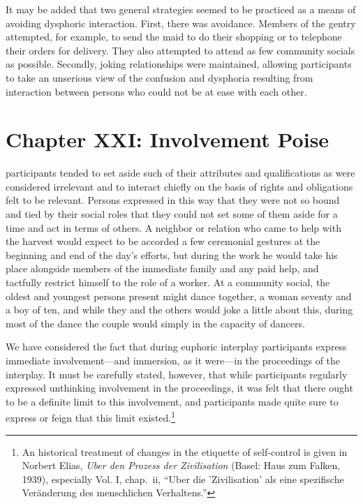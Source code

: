 \documentclass[twoside,symmetric,nobib,justified]{tufte-book}
\let\oldchapter\chapter
\def\chapter{%
  \setcounter{footnote}{0}%
  \oldchapter
}
\begin{document}
It may be added that two general strategies seemed to be practiced as a
means of avoiding dysphoric interaction. First, there was avoidance.
Members of the gentry attempted, for example, to send the maid to do
their shopping or to telephone their orders for delivery. They also
attempted to attend as few community socials as possible. Secondly,
joking relationships were maintained, allowing participants to take an
unserious view of the confusion and dysphoria resulting from interaction
between persons who could not be at ease with each other.

\chapter[CHAPTER XXI: INVOLVEMENT POISE]{Chapter XXI: Involvement Poise}
\label{ch:Chapter XXI: Involvement Poise}

 participants tended to set aside such of
their attributes and qualifications as were considered irrelevant and to
interact chiefly on the basis of rights and obligations felt to be
relevant. Persons expressed in this way that they were not so bound and
tied by their social roles that they could not set some of them aside
for a time and act in terms of others. A neighbor or relation who came
to help with the harvest would expect to be accorded a few ceremonial
gestures at the beginning and end of the day's efforts, but during the
work he would take his place alongside members of the immediate family
and any paid help, and tactfully restrict himself to the role of a
worker. At a community social, the oldest and youngest persons present
might dance together, a woman seventy and a boy of ten, and while they
and the others would joke a little about this, during most of the dance
the couple would simply in the capacity of dancers.

We have considered the fact that during euphoric interplay participants
express immediate involvement---and immersion, as it were---in the
proceedings of the interplay. It must be carefully stated, however, that
while participants regularly expressed unthinking involvement in the
proceedings, it was felt that there ought to be a definite limit to this
involvement, and participants made quite sure to express or feign that
this limit existed.\footnote{An historical treatment of changes in the
  etiquette of self-control is given in Norbert Elias, \emph{Uber den
  Prozess der Zivilisation} (Basel: Haus zum Falken, 1939), especially
  Vol. I, chap.~ii, ``Uber die 'Zivilisation' als eine spezifische
  Veränderung des menschlichen Verhaltens.''}
\end{document}
